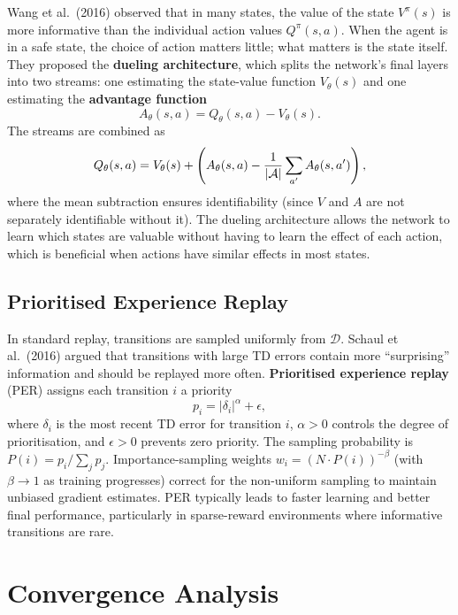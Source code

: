 Wang et al.~(2016) observed that in many states, the value of the state $V^\pi(s)$ is more
informative than the individual action values $Q^\pi(s, a)$.  When the agent is in a safe state,
the choice of action matters little; what matters is the state itself.  They proposed the
\textbf{dueling architecture}, which splits the network's final
layers into two streams: one estimating the state-value function $V_\theta(s)$ and one estimating
the \textbf{advantage function}
\[
A_\theta(s, a) = Q_\theta(s, a) - V_\theta(s).
\]
The streams are combined as
\begin{equation}
\label{eq:dueling}
Q_\theta(s, a) = V_\theta(s) + \left(A_\theta(s, a) - \frac{1}{|\mathcal{A}|}\sum_{a'} A_\theta(s, a')\right),
\end{equation}
where the mean subtraction ensures identifiability (since $V$ and $A$ are not separately
identifiable without it).  The dueling architecture allows the network to learn which states are
valuable without having to learn the effect of each action, which is beneficial when actions have
similar effects in most states.

\subsection{Prioritised Experience Replay}
\label{subsec:per}

In standard replay, transitions are sampled uniformly from $\mathcal{D}$.  Schaul et al.~(2016)
argued that transitions with large TD errors contain more ``surprising'' information and should be
replayed more often.  \textbf{Prioritised experience replay}
(PER) assigns each transition $i$ a priority
\[
p_i = |\delta_i|^\alpha + \epsilon,
\]
where $\delta_i$ is the most recent TD error for transition $i$, $\alpha > 0$ controls the
degree of prioritisation, and $\epsilon > 0$ prevents zero priority.  The sampling probability is
$P(i) = p_i / \sum_j p_j$.  Importance-sampling weights $w_i = (N \cdot P(i))^{-\beta}$ (with
$\beta \to 1$ as training progresses) correct for the non-uniform sampling to maintain unbiased
gradient estimates.  PER typically leads to faster learning and better final performance,
particularly in sparse-reward environments where informative transitions are rare.

\section{Convergence Analysis}
\label{sec:convergence-vfa}


